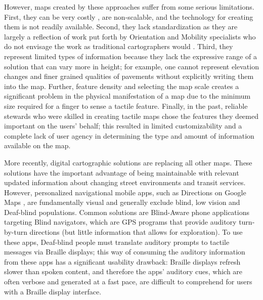 However, maps created by these approaches suffer from some serious limitations. First, they can be very costly \cite{rice2005design}, are non-scalable, and the technology for creating them is not readily available. Second, they lack standardization as they are largely a reflection of work put forth by Orientation and Mobility specialists who do not envisage the work as traditional cartographers would \cite{lobben2012tactile, gual2012visual}. Third, they represent limited types of information because they lack the expressive range of a solution that can vary more in height; for example, one cannot represent elevation changes and finer grained qualities of pavements without explicitly writing them into the map. Further, feature density and selecting the map scale creates a significant problem in the physical manifestation of a map due to the minimum size required for a finger to sense a tactile feature. Finally, in the past, reliable stewards who were skilled in creating tactile maps chose the features they deemed important on the users’ behalf; this resulted in limited customizability and a complete lack of user agency in determining the type and amount of information available on the map. 


More recently, digital cartographic solutions are replacing all other maps. These solutions have the important advantage of being maintainable with relevant updated information about changing street environments and transit services. However, personalized navigational mobile apps, such as Directions on Google Maps \cite{GoogleMaps}, are fundamentally visual and generally exclude blind, low vision and Deaf-blind populations. Common solutions are Blind-Aware phone applications targeting Blind navigators, which are GPS programs that provide auditory turn-by-turn directions (but little information that allows for exploration). To use these apps, Deaf-blind people must translate auditory prompts to tactile messages via Braille displays; this way of consuming the auditory information from these apps has a significant usability drawback: Braille displays refresh slower than spoken content, and therefore the apps' auditory cues, which are often verbose and generated at a fast pace, are difficult to comprehend for users with a Braille display interface.  

